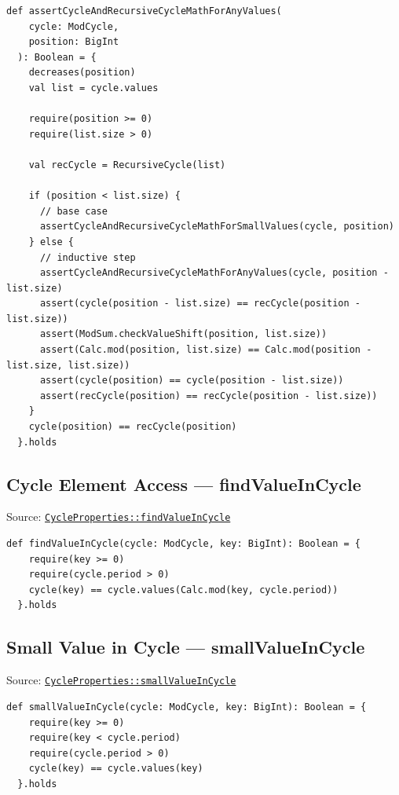 \begin{lstlisting}[style=scala]
  def assertCycleAndRecursiveCycleMathForAnyValues(
    cycle: ModCycle,
    position: BigInt
  ): Boolean = {
    decreases(position)
    val list = cycle.values

    require(position >= 0)
    require(list.size > 0)

    val recCycle = RecursiveCycle(list)

    if (position < list.size) {
      // base case
      assertCycleAndRecursiveCycleMathForSmallValues(cycle, position)
    } else {
      // inductive step
      assertCycleAndRecursiveCycleMathForAnyValues(cycle, position - list.size)
      assert(cycle(position - list.size) == recCycle(position - list.size))
      assert(ModSum.checkValueShift(position, list.size))
      assert(Calc.mod(position, list.size) == Calc.mod(position - list.size, list.size))
      assert(cycle(position) == cycle(position - list.size))
      assert(recCycle(position) == recCycle(position - list.size))
    }
    cycle(position) == recCycle(position)
  }.holds
\end{lstlisting}

\subsection{Cycle Element Access --- findValueInCycle}

Source:
\href{https://github.com/thiagomata/prime-numbers/blob/cycle-article-v1.0.0/src/main/scala/v1/chapter4/cycle/properties/CycleProperties.scala}{\texttt{CycleProperties::findValueInCycle}}

\begin{lstlisting}[style=scala]
  def findValueInCycle(cycle: ModCycle, key: BigInt): Boolean = {
    require(key >= 0)
    require(cycle.period > 0)
    cycle(key) == cycle.values(Calc.mod(key, cycle.period))
  }.holds
\end{lstlisting}

\subsection{Small Value in Cycle --- smallValueInCycle}

Source:
\href{https://github.com/thiagomata/prime-numbers/blob/cycle-article-v1.0.0/src/main/scala/v1/chapter4/cycle/properties/CycleProperties.scala}{\texttt{CycleProperties::smallValueInCycle}}

\begin{lstlisting}[style=scala]
  def smallValueInCycle(cycle: ModCycle, key: BigInt): Boolean = {
    require(key >= 0)
    require(key < cycle.period)
    require(cycle.period > 0)
    cycle(key) == cycle.values(key)
  }.holds
\end{lstlisting}

